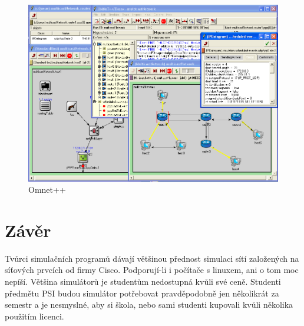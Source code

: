 \begin{figure}[h]
\begin{center}
\includegraphics[width=12cm]{obrazky/omnet}
\caption{Omnet++}
\label{obr_omnet}
\end{center}
\end{figure}




\section{Závěr}

Tvůrci simulačních programů dávají většinou přednost simulaci sítí založených na síťových prvcích od firmy Cisco. Podporují-li i počítače s linuxem, ani o tom moc nepíší. Většina simulátorů je studentům nedostupná kvůli své ceně. Studenti předmětu PSI budou simulátor potřebovat pravděpodobně jen několikrát za semestr a je nesmyslné, aby si škola, nebo sami studenti kupovali kvůli několika použitím licenci.

